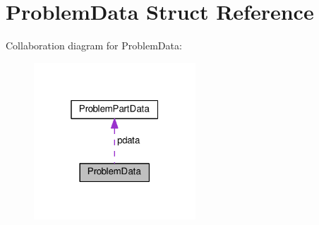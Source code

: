 \hypertarget{structProblemData}{}\section{Problem\+Data Struct Reference}
\label{structProblemData}


Collaboration diagram for Problem\+Data\+:
\nopagebreak
\begin{figure}[H]
\begin{center}
\leavevmode
\includegraphics[width=172pt]{structProblemData__coll__graph}
\end{center}
\end{figure}
